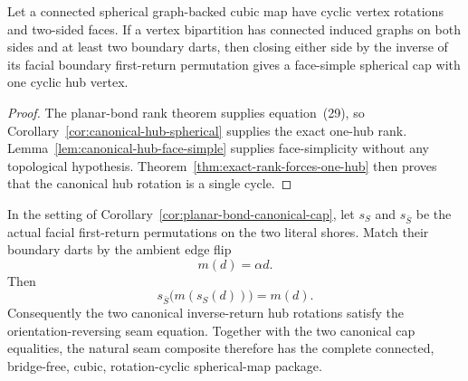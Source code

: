\begin{corollary}
\label{cor:planar-bond-canonical-cap}
Let a connected spherical graph-backed cubic map have cyclic vertex
rotations and two-sided faces.  If a vertex bipartition has connected induced
graphs on both sides and at least two boundary darts, then closing either
side by the inverse of its facial boundary first-return permutation gives a
face-simple spherical cap with one cyclic hub vertex.
\end{corollary}

\begin{proof}
The planar-bond rank theorem supplies equation~(29), so
Corollary~\ref{cor:canonical-hub-spherical} supplies the exact one-hub rank.
Lemma~\ref{lem:canonical-hub-face-simple} supplies face-simplicity without
any topological hypothesis.  Theorem~\ref{thm:exact-rank-forces-one-hub}
then proves that the canonical hub rotation is a single cycle.
\end{proof}

\begin{theorem}
\label{thm:planar-bond-orders-opposite}
In the setting of Corollary~\ref{cor:planar-bond-canonical-cap}, let
\(s_S\) and \(s_{\bar S}\) be the actual facial first-return permutations
on the two literal shores.  Match their boundary darts by the ambient edge
flip
\[
                         m(d)=\alpha d.
\]
Then
\[
              s_{\bar S}\bigl(m(s_S(d))\bigr)=m(d).       \tag{29b}
\]
Consequently the two canonical inverse-return hub rotations satisfy the
orientation-reversing seam equation.
Together with the two canonical cap equalities, the natural seam composite
therefore has the complete connected, bridge-free, cubic, rotation-cyclic
spherical-map package.
\end{theorem}

